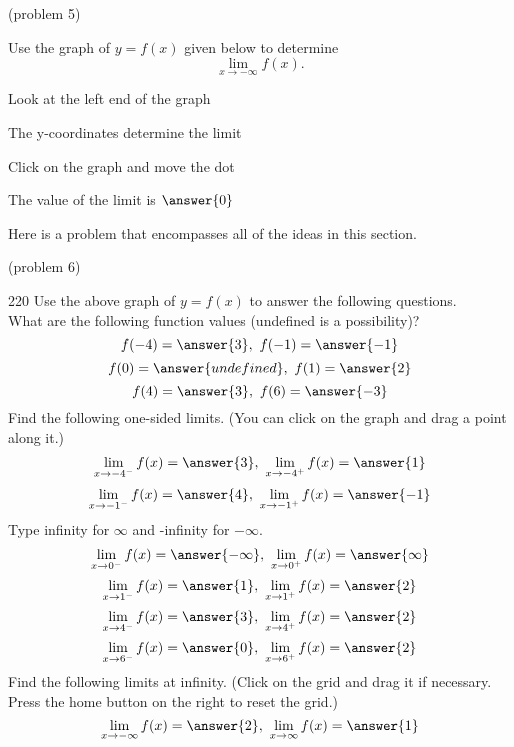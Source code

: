 \documentclass[handout]{ximera}
\begin{document}
\begin{problem}(problem 5)

  Use the graph of $y = f(x)$ given below to determine
  \[
  \lim_{x\to -\infty} f(x).
  \]
  
    \begin{hint}
      Look at the left end of the graph
    \end{hint}
    \begin{hint}
      The y-coordinates determine the limit
    \end{hint}
		\begin{hint}
		  Click on the graph and move the dot
		\end{hint}
		The value of the limit is
		 $\answer{0}$

	
\end{problem}

Here is a problem that encompasses all of the ideas in this section.

\begin{problem}(problem 6)
	\begin{leash}{220}
	Use the above graph of $y = f(x)$ to answer the following questions.\\
	
  
  What are the following function values (undefined is a possibility)?  
		 \[f(-4) = \answer{3}, \ f(-1) = \answer{-1} \]
		 \[f(0) = \answer{undefined}, \ f(1) = \answer{2} \]
	   \[f(4) = \answer{3}, \ f(6) = \answer{-3} \]
	Find the following one-sided limits. (You can click on the graph and drag a point along it.)
	\[\lim_{x\to -4^-} f(x) = \answer{3}, \ \lim_{x\to -4^+} f(x) = \answer{1}\]
	\[\lim_{x\to -1^-} f(x) = \answer{4}, \ \lim_{x\to -1^+} f(x) = \answer{-1}\]
	Type infinity for $\infty$ and -infinity for $-\infty$.
	\[\lim_{x\to 0^-} f(x) = \answer{-\infty}, \ \lim_{x\to 0^+} f(x) = \answer{\infty}\]
	\[\lim_{x\to 1^-} f(x) = \answer{1}, \ \lim_{x\to 1^+} f(x) = \answer{2}\]
	\[\lim_{x\to 4^-} f(x) = \answer{3}, \ \lim_{x\to 4^+} f(x) = \answer{2}\]
	\[\lim_{x\to 6^-} f(x) = \answer{0}, \ \lim_{x\to 6^+} f(x) = \answer{2}\]
	Find the following limits at infinity. (Click on the grid and drag it if necessary.  
	Press the home button on the right to reset the grid.)
	\[\lim_{x\to -\infty} f(x) = \answer{2}, \ \lim_{x\to \infty} f(x) = \answer{1}\]
	
	\end{leash}
\end{problem}
\end{document}
